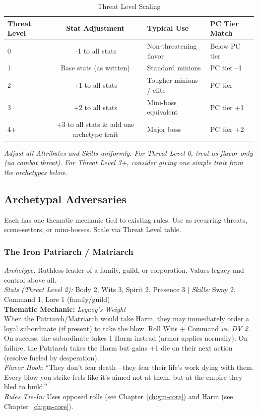 \begin{table}[htbp]
\centering
\caption{Threat Level Scaling}
\label{tab:threat-scaling}
\begin{tabular}{lcll}
\toprule
\textbf{Threat Level} & \textbf{Stat Adjustment} & \textbf{Typical Use} & \textbf{PC Tier Match} \\
\midrule
0 & --1 to all stats & Non-threatening flavor & Below PC tier \\
1 & Base stats (as written) & Standard minions & PC tier --1 \\
2 & +1 to all stats & Tougher minions / elite & PC tier \\
3 & +2 to all stats & Mini-boss equivalent & PC tier +1 \\
4+ & +3 to all stats \& add one archetype trait & Major boss & PC tier +2 \\
\bottomrule
\end{tabular}
\end{table}
\par\smallskip\textit{Adjust all Attributes and Skills uniformly. For Threat Level 0, treat as flavor only (no combat threat). For Threat Level 3+, consider giving one simple trait from the archetypes below.}

\subsection{Archetypal Adversaries}
\label{subsec:archetypal-adversaries}
Each has one thematic mechanic tied to existing rules. Use as recurring threats, scene-setters, or mini-bosses. Scale via Threat Level table.

\subsubsection{The Iron Patriarch / Matriarch}
\textit{Archetype:} Ruthless leader of a family, guild, or corporation. Values legacy and control above all.\\
\textit{Stats (Threat Level 2):} Body 2, Wits 3, Spirit 2, Presence 3 \quad | \quad \textit{Skills:} Sway 2, Command 1, Lore 1 (family/guild)\\
\textbf{Thematic Mechanic:} \textit{Legacy's Weight} \\
When the Patriarch/Matriarch would take Harm, they may immediately order a loyal subordinate (if present) to take the blow. Roll Wits + Command \textit{vs. DV 2}. On success, the subordinate takes 1 Harm instead (armor applies normally). On failure, the Patriarch takes the Harm but gains +1 die on their next action (resolve fueled by desperation).\\
\textit{Flavor Hook:} ``They don't fear death---they fear their life's work dying with them. Every blow you strike feels like it's aimed not at them, but at the empire they bled to build.''\\
\textit{Rules Tie-In:} Uses opposed rolls (see Chapter~\ref{ch:gm-core}) and Harm (see Chapter~\ref{ch:gm-core}).

